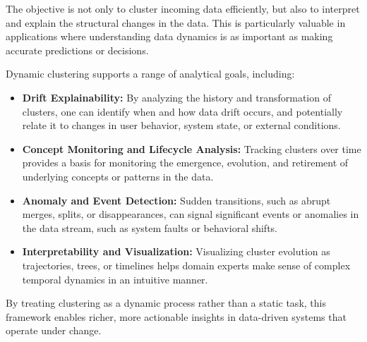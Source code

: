 The objective is not only to cluster incoming data efficiently, but also to
interpret and explain the structural changes in the data. This is particularly
valuable in applications where understanding data dynamics is as important as
making accurate predictions or decisions.

Dynamic clustering supports a range of analytical goals, including:

\begin{itemize}
    \item \textbf{Drift Explainability:} By analyzing the history and transformation of
          clusters, one can identify when and how data drift occurs, and potentially
          relate it to changes in user behavior, system state, or external conditions.

    \item \textbf{Concept Monitoring and Lifecycle Analysis:} Tracking clusters over time
          provides a basis for monitoring the emergence, evolution, and retirement of
          underlying concepts or patterns in the data.

    \item \textbf{Anomaly and Event Detection:} Sudden transitions, such as abrupt merges,
          splits, or disappearances, can signal significant events or anomalies in the data stream,
          such as system faults or behavioral shifts.

    \item \textbf{Interpretability and Visualization:} Visualizing cluster evolution as
          trajectories, trees, or timelines helps domain experts make sense of complex temporal
          dynamics in an intuitive manner.
\end{itemize}

By treating clustering as a dynamic process rather than a static task, this
framework enables richer, more actionable insights in data-driven systems that
operate under change.